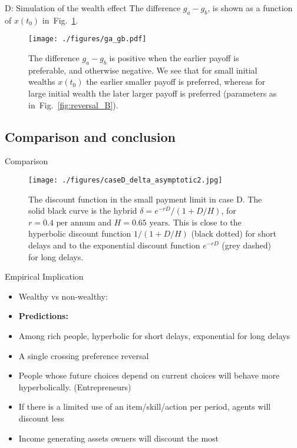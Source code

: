 \documentclass{beamer}
\newcommand{\flabel}[1]{\label{fig:#1}}
\newcommand{\fref}[1]{Fig.~\ref{fig:#1}}
\newcommand{\del}{D}
\newcommand{\hor}{H}
\numberwithin{equation}{section}
\begin{document}
\begin{frame}{D: Simulation of the wealth effect}
The difference $g_a-g_b$, is shown as a function of $x(t_0)$ in~\fref{reversal_B2}. 

\begin{figure}[!htb]
\centering
\texttt{[image: ./figures/ga\_gb.pdf]}
\caption{The difference $g_a-g_b$ is positive when the earlier payoff is preferable, and otherwise negative. We see that for small initial wealths $x(t_0)$ the earlier smaller payoff is preferred, whereas for large initial wealth the later larger payoff is preferred (parameters as in~\fref{reversal_B}).}
\flabel{reversal_B2}
\end{figure}
\end{frame}

\subsection{Comparison and conclusion}
\begin{frame}{Comparison}
\begin{figure}[!htb]
\centering
\texttt{[image: ./figures/caseD\_delta\_asymptotic2.jpg]}
\caption{The discount function in the small payment limit in case D. The solid black curve is the hybrid $\delta = e^{-r\del}/(1+\del/\hor)$, for $r=0.4\text{ per annum}$ and $\hor=0.65\text{ years}$. This is close to the hyperbolic discount function $1/(1+\del/\hor)$ (black dotted) for short delays and to the exponential discount function $e^{-r\del}$ (grey dashed) for long delays.}
\flabel{shortpaymentasymp}
\end{figure}
\end{frame}



\begin{frame}{Empirical Implication}
\begin{itemize}
    \item Wealthy vs non-wealthy: \citep{GreenETAL1996,EpperETAL2018}
    \item \textbf{Predictions:}
    \item Among rich people, hyperbolic for short delays, exponential for long delays
    \item A single crossing preference reversal
    \item People whose future choices depend on current choices will behave more hyperbolically. (Entrepreneurs) 
    \item If there is a limited use of an item/skill/action per period, agents will discount less
    \item Income generating assets owners will discount the most
\end{itemize}
\end{frame}
\end{document}
